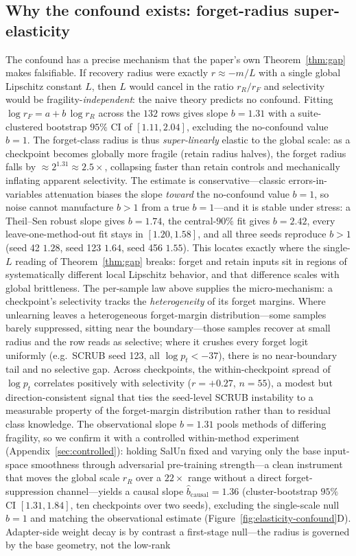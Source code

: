 \documentclass{article}
\begin{document}
\subsection{Why the confound exists: forget-radius super-elasticity}
The confound has a precise mechanism that the paper's own Theorem~\ref{thm:gap} makes falsifiable. If recovery radius were exactly $r \approx -m/L$ with a single global Lipschitz constant $L$, then $L$ would cancel in the ratio $r_R/r_F$ and selectivity would be fragility-\emph{independent}: the naive theory predicts no confound. Fitting $\log r_F = a + b\,\log r_R$ across the $132$ rows gives slope $b = 1.31$ with a suite-clustered bootstrap $95\%$ CI of $[1.11, 2.04]$, excluding the no-confound value $b = 1$. The forget-class radius is thus \emph{super-linearly} elastic to the global scale: as a checkpoint becomes globally more fragile (retain radius halves), the forget radius falls by $\approx 2^{1.31}\!\approx\!2.5\times$, collapsing faster than retain controls and mechanically inflating apparent selectivity. The estimate is conservative---classic errors-in-variables attenuation biases the slope \emph{toward} the no-confound value $b=1$, so noise cannot manufacture $b>1$ from a true $b=1$---and it is stable under stress: a Theil--Sen robust slope gives $b=1.74$, the central-$90\%$ fit gives $b=2.42$, every leave-one-method-out fit stays in $[1.20,1.58]$, and all three seeds reproduce $b>1$ (seed 42 $1.28$, seed 123 $1.64$, seed 456 $1.55$). This locates exactly where the single-$L$ reading of Theorem~\ref{thm:gap} breaks: forget and retain inputs sit in regions of systematically different local Lipschitz behavior, and that difference scales with global brittleness. The per-sample law above supplies the micro-mechanism: a checkpoint's selectivity tracks the \emph{heterogeneity} of its forget margins. Where unlearning leaves a heterogeneous forget-margin distribution---some samples barely suppressed, sitting near the boundary---those samples recover at small radius and the row reads as selective; where it crushes every forget logit uniformly (e.g.\ SCRUB seed 123, all $\log p_t < -37$), there is no near-boundary tail and no selective gap. Across checkpoints, the within-checkpoint spread of $\log p_t$ correlates positively with selectivity ($r=+0.27$, $n=55$), a modest but direction-consistent signal that ties the seed-level SCRUB instability to a measurable property of the forget-margin distribution rather than to residual class knowledge. The observational slope $b=1.31$ pools methods of differing fragility, so we confirm it with a controlled within-method experiment (Appendix~\ref{sec:controlled}): holding SalUn fixed and varying only the base input-space smoothness through adversarial pre-training strength---a clean instrument that moves the global scale $r_R$ over a $22\times$ range without a direct forget-suppression channel---yields a causal slope $\hat b_{\text{causal}} = 1.36$ (cluster-bootstrap $95\%$ CI $[1.31,1.84]$, ten checkpoints over two seeds), excluding the single-scale null $b=1$ and matching the observational estimate (Figure~\ref{fig:elasticity-confound}D). Adapter-side weight decay is by contrast a first-stage null---the radius is governed by the base geometry, not the low-rank 
\end{document}
